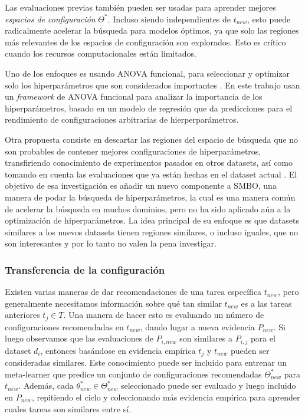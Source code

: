 Las evaluaciones previas también pueden ser usadas para aprender mejores \textit{espacios de configuración} $\Theta^*$. Incluso siendo independientes de $t_{new}$, esto puede radicalmente acelerar la búsqueda para modelos óptimos, ya que solo las regiones más relevantes de los espacios de configuración son explorados. Esto es crítico cuando los recursos computacionales están limitados. 

Uno de los enfoques es usando ANOVA funcional, para seleccionar y optimizar solo los hiperparámetros que son considerados importantes \cite{rijn2018hyp}. En este trabajo usan un \textit{framework} de ANOVA funcional para analizar la importancia de los hiperparámetros, basado en un modelo de regresión que da predicciones para el rendimiento de configuraciones arbitrarias de hierperparámetros.

Otra propuesta consiste en descartar las regiones del espacio de búsqueda que no son probables de contener mejores configuraciones de hiperparámetros, transfiriendo conocimiento de experimentos pasados en otros datasets, así como tomando en cuenta las evaluaciones que ya están hechas en el dataset actual \cite{witsuba2015hyper}. El objetivo de esa investigación es añadir un nuevo componente a SMBO, una manera de podar la búsqueda de hiperparámetros, la cual es una manera común de acelerar la búsqueda en muchos dominios, pero no ha sido aplicado aún a la optimización de hiperparámetros. La idea principal de su enfoque es que datasets similares a los nuevos datasets tienen regiones similares, o incluso iguales, que no son interesantes y por lo tanto no valen la pena investigar.

\subsubsection{Transferencia de la configuración}


Existen varias maneras de dar recomendaciones de una tarea específica $t_{new}$, pero generalmente necesitamos información sobre qué tan similar $t_{new}$ es a las tareas anteriores $t_j \in T$. Una manera de hacer esto es evaluando un número de configuraciones recomendadas en $t_{new}$, dando lugar a nueva evidencia $P_{new}$. Si luego observamos que las evaluaciones de $P_{i,new}$ son similares a $P_{i,j}$ para el dataset $d_i$, entonces basándose en evidencia empírica $t_j$ y $t_{new}$ pueden ser consideradas similares. Este conocimiento puede ser incluido para entrenar un meta-learner que predice un conjunto de configuraciones recomendadas $\Theta_{new}^*$ para $t_{new}$. Además, cada $\theta^*_{new} \in \Theta_{new}^*$ seleccionado puede ser evaluado y luego incluido en $P_{new}$, repitiendo el ciclo y coleccionando más evidencia empírica para aprender cuales tareas son similares entre sí.

